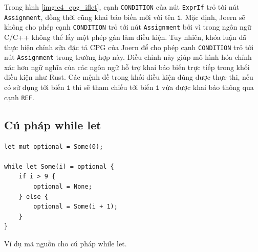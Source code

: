 
Trong hình \ref{img:c4_cpg_iflet}, cạnh \texttt{CONDITION} của nút \texttt{ExprIf} trỏ tới nút \texttt{Assignment}, đồng thời cũng khai báo biến mới với tên \texttt{i}.
Mặc định, Joern sẽ không cho phép cạnh \texttt{CONDITION} trỏ tới nút \texttt{Assignment} bởi vì trong ngôn ngữ C/C++ không thể lấy một phép gán làm điều kiện.
Tuy nhiên, khóa luận đã thực hiện chỉnh sửa đặc tả CPG của Joern để cho phép cạnh \texttt{CONDITION} trỏ tới nút \texttt{Assignment} trong trường hợp này.
Điều chỉnh này giúp mô hình hóa chính xác hơn ngữ nghĩa của các ngôn ngữ hỗ trợ khai báo biến trực tiếp trong khối điều kiện như Rust.
Các mệnh đề trong khối điều kiện đúng được thực thi, nếu có sử dụng tới biến \texttt{i} thì sẽ tham chiếu tới biến \texttt{i} vừa được khai báo thông qua cạnh \texttt{REF}.

\subsection{Cú pháp while let}




\begin{listing}[H]
\begin{verbatim}
let mut optional = Some(0);

while let Some(i) = optional {
    if i > 9 {
        optional = None;
    } else {
        optional = Some(i + 1);
    }
}
\end{verbatim}
\caption{Ví dụ mã nguồn cho cú pháp while let.}
\label{code:c4_whilelet}
\end{listing}

